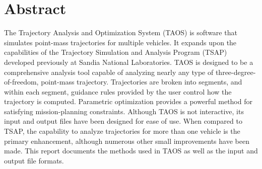 \chapter*{Abstract}

The Trajectory Analysis and Optimization System (TAOS) is software that simulates
point-mass trajectories for multiple vehicles. It expands upon the capabilities of the
Trajectory Simulation and Analysis Program (TSAP) developed previously at Sandia
National Laboratories. TAOS is designed to be a comprehensive analysis tool capable
of analyzing nearly any type of three-degree-of-freedom, point-mass trajectory.
Trajectories are broken into segments, and within each segment, guidance rules
provided by the user control how the trajectory is computed. Parametric optimization
provides a powerful method for satisfying mission-planning constraints. Although
TAOS is not interactive, its input and output files have been designed for ease of use.
When compared to TSAP, the capability to analyze trajectories for more than one
vehicle is the primary enhancement, although numerous other small improvements
have been made. This report documents the methods used in TAOS as well as the
input and output file formats.
